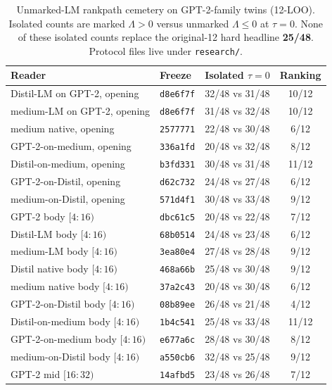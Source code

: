 \documentclass[11pt,a4paper]{article}
\theoremstyle{definition}
\newcommand{\LLR}{\Lambda}
\begin{document}
\begin{table}[ht]
\centering
\scriptsize
\caption{Unmarked-LM rankpath cemetery on GPT-2-family twins (12-LOO).
Isolated counts are marked $\LLR>0$ versus unmarked $\LLR\le 0$ at
$\tau=0$. None of these isolated counts replace the original-12 hard
headline \textbf{25/48}. Protocol files live under \texttt{research/}.}
\label{tab:rankpath}
\begin{tabular}{@{}llcc@{}}
\toprule
Reader & Freeze & Isolated $\tau=0$ & Ranking \\
\midrule
Distil-LM on GPT-2, opening & \texttt{d8e6f7f} & 32/48 vs 31/48 & 10/12 \\
medium-LM on GPT-2, opening & \texttt{d8e6f7f} & 31/48 vs 32/48 & 10/12 \\
medium native, opening & \texttt{2577771} & 22/48 vs 30/48 & 6/12 \\
GPT-2-on-medium, opening & \texttt{336a1fd} & 20/48 vs 32/48 & 8/12 \\
Distil-on-medium, opening & \texttt{b3fd331} & 30/48 vs 31/48 & 11/12 \\
GPT-2-on-Distil, opening & \texttt{d62c732} & 24/48 vs 27/48 & 6/12 \\
medium-on-Distil, opening & \texttt{571d4f1} & 30/48 vs 33/48 & 9/12 \\
GPT-2 body $[4{:}16)$ & \texttt{dbc61c5} & 20/48 vs 22/48 & 7/12 \\
Distil-LM body $[4{:}16)$ & \texttt{68b0514} & 24/48 vs 23/48 & 6/12 \\
medium-LM body $[4{:}16)$ & \texttt{3ea80e4} & 27/48 vs 28/48 & 9/12 \\
Distil native body $[4{:}16)$ & \texttt{468a66b} & 25/48 vs 30/48 & 9/12 \\
medium native body $[4{:}16)$ & \texttt{37a2c43} & 20/48 vs 30/48 & 6/12 \\
GPT-2-on-Distil body $[4{:}16)$ & \texttt{08b89ee} & 26/48 vs 21/48 & 4/12 \\
Distil-on-medium body $[4{:}16)$ & \texttt{1b4c541} & 25/48 vs 33/48 & 11/12 \\
GPT-2-on-medium body $[4{:}16)$ & \texttt{e677a6c} & 28/48 vs 30/48 & 8/12 \\
medium-on-Distil body $[4{:}16)$ & \texttt{a550cb6} & 32/48 vs 25/48 & 9/12 \\
GPT-2 mid $[16{:}32)$ & \texttt{14afbd5} & 23/48 vs 26/48 & 7/12 \\
\bottomrule
\end{tabular}
\end{table}
\end{document}
